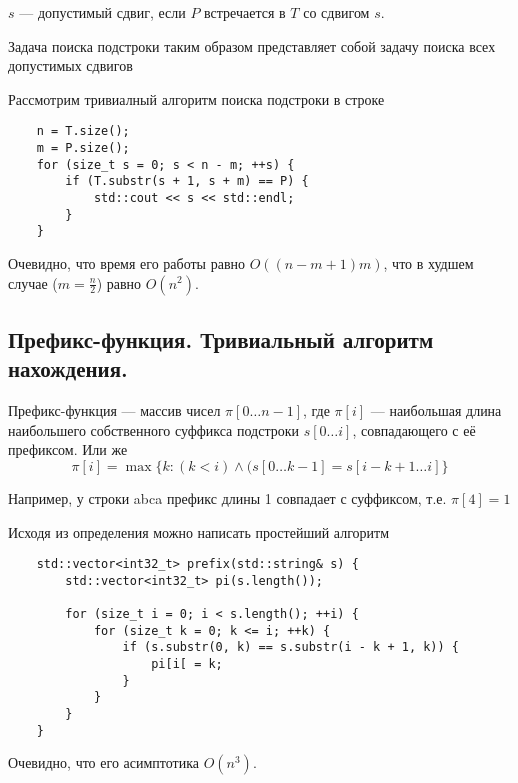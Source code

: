 \begin{definition}
	$s$ --- допустимый сдвиг, если $P$ встречается в $T$ со сдвигом $s$.
\end{definition}

\begin{remark}
	Задача поиска подстроки таким образом представляет собой задачу поиска всех допустимых сдвигов
\end{remark}

Рассмотрим тривиалный алгоритм поиска подстроки в строке

\begin{lstlisting}
	n = T.size();
	m = P.size();
	for (size_t s = 0; s < n - m; ++s) {
		if (T.substr(s + 1, s + m) == P) {
			std::cout << s << std::endl;
		}
	}
\end{lstlisting}

\begin{remark}
	Очевидно, что время его работы равно $O((n - m + 1)m)$, что в худшем случае ($m = \frac{n}{2}$) равно
	$O(n^2)$.
\end{remark}

\subsection{Префикс-функция. Тривиальный алгоритм нахождения.}

\begin{definition}
	Префикс-функция --- массив чисел $\pi [0 \ldots n-1]$, где $\pi [i]$ --- наибольшая длина наибольшего
	собственного суффикса подстроки $s[0 \ldots i]$, совпадающего с её префиксом. Или же
	 \[
		 \pi[i] = \max \{ k \colon (k < i) \wedge (s[0 \ldots k-1] = s[i - k + 1 \ldots i] \}
	\] 
\end{definition}

Например, у строки abca префикс длины 1 совпадает с суффиксом, т.е. $\pi [4] = 1$

Исходя из определения можно написать простейший алгоритм

\begin{lstlisting}
	std::vector<int32_t> prefix(std::string& s) {
		std::vector<int32_t> pi(s.length());

		for (size_t i = 0; i < s.length(); ++i) {
			for (size_t k = 0; k <= i; ++k) {
				if (s.substr(0, k) == s.substr(i - k + 1, k)) {
					pi[i[ = k;
				}
			}
		}
	}
\end{lstlisting}

\begin{remark}
	Очевидно, что его асимптотика $O(n^3)$.
\end{remark}

